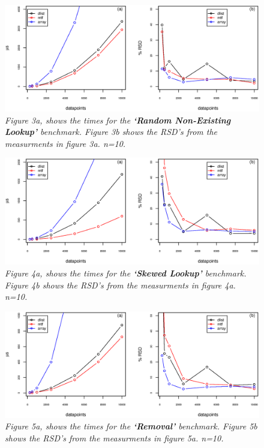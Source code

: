 \documentclass[a4paper,11pt,twoside]{article}
\begin{document}
\begin{figure}[H] 
\centering 
\includegraphics[width=\textwidth]{figures/fig3.eps}
\caption{\textit{Figure 3a, shows the times for the \textbf{`Random
      Non-Existing Lookup'} benchmark. Figure 3b shows the RSD's from
    the measurments in figure 3a. n=10.}}
\end{figure}

\begin{figure}[H] 
\centering 
\includegraphics[width=\textwidth]{figures/fig4.eps}
\caption{\textit{Figure 4a, shows the times for the \textbf{`Skewed
      Lookup'} benchmark. Figure 4b shows the RSD's from the
    measurments in figure 4a. n=10.}}
\end{figure}

\begin{figure}[H] 
\centering 
\includegraphics[width=\textwidth]{figures/fig5.eps}
\caption{\textit{Figure 5a, shows the times for the \textbf{`Removal'}
    benchmark. Figure 5b shows the RSD's from the measurments in figure 5a. n=10.}}
\end{figure}
\end{document}

